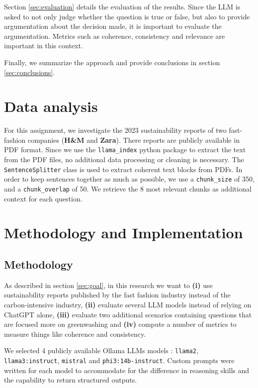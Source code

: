 \documentclass[]{article}
\begin{document}
Section \ref{sec:evaluation} details the evaluation of the results.
Since the LLM is asked to not only judge whether the question is true or false, but also to provide argumentation about the decision made, it is important to evaluate the argumentation.
Metrics such as coherence, consistency and relevance are important in this context.

Finally, we summarize the approach and provide conclusions in section \ref{sec:conclusions}.

\section{Data analysis} \label{sec:data analysis}

For this assignment, we investigate the 2023 sustainability reports of two fast-fashion companies (\textbf{H\&M} and \textbf{Zara}).
There reports are publicly available in PDF format.
Since we use the \texttt{llama\_index} python package to extract the text from the PDF files, no additional data processing or cleaning is necessary.
The \texttt{SentenceSplitter} class is used to extract coherent text blocks from PDFs.
In order to keep sentences together as much as possible, we use a \texttt{chunk\_size} of 350, and a \texttt{chunk\_overlap} of 50.
We retrieve the 8 most relevant chunks as additional context for each question.

\section{Methodology and Implementation} \label{sec:methodology}

\subsection{Methodology}

As described in section \ref{sec:goal}, in this research we want to \textbf{(i)} use sustainability reports published by the fast fashion industry instead of the carbon-intensive industry, \textbf{(ii)} evaluate several LLM models instead of relying on ChatGPT alone, \textbf{(iii)} evaluate two additional scenarios containing questions that are focused more on greenwashing and \textbf{(iv)} compute a number of metrics to measure things like coherence and consistency.

We selected 4 publicly available Ollama LLMs models : \texttt{llama2}, \texttt{llama3:instruct}, \texttt{mistral} and \texttt{phi3:14b-instruct}.
Custom prompts were written for each model to accommodate for the difference in reasoning skills and the capability to return structured outputs.
\end{document}
